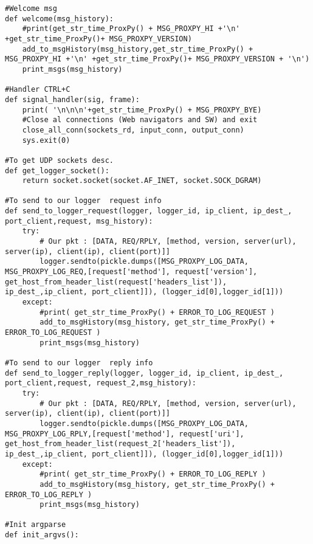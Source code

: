 \begin{verbatim}
#Welcome msg
def welcome(msg_history):
    #print(get_str_time_ProxPy() + MSG_PROXPY_HI +'\n' +get_str_time_ProxPy()+ MSG_PROXPY_VERSION)
    add_to_msgHistory(msg_history,get_str_time_ProxPy() + MSG_PROXPY_HI +'\n' +get_str_time_ProxPy()+ MSG_PROXPY_VERSION + '\n')
    print_msgs(msg_history)

#Handler CTRL+C
def signal_handler(sig, frame):
    print( '\n\n\n'+get_str_time_ProxPy() + MSG_PROXPY_BYE)
    #Close al connections (Web navigators and SW) and exit
    close_all_conn(sockets_rd, input_conn, output_conn)
    sys.exit(0)

#To get UDP sockets desc.
def get_logger_socket():
    return socket.socket(socket.AF_INET, socket.SOCK_DGRAM)

#To send to our logger  request info 
def send_to_logger_request(logger, logger_id, ip_client, ip_dest_, port_client,request, msg_history):
    try:
        # Our pkt : [DATA, REQ/RPLY, [method, version, server(url), server(ip), client(ip), client(port)]]
        logger.sendto(pickle.dumps([MSG_PROXPY_LOG_DATA, MSG_PROXPY_LOG_REQ,[request['method'], request['version'], get_host_from_header_list(request['headers_list']), ip_dest_,ip_client, port_client]]), (logger_id[0],logger_id[1]))
    except:
        #print( get_str_time_ProxPy() + ERROR_TO_LOG_REQUEST )
        add_to_msgHistory(msg_history, get_str_time_ProxPy() + ERROR_TO_LOG_REQUEST )
        print_msgs(msg_history)

#To send to our logger  reply info 
def send_to_logger_reply(logger, logger_id, ip_client, ip_dest_, port_client,request, request_2,msg_history):
    try:
        # Our pkt : [DATA, REQ/RPLY, [method, version, server(url), server(ip), client(ip), client(port)]]
        logger.sendto(pickle.dumps([MSG_PROXPY_LOG_DATA, MSG_PROXPY_LOG_RPLY,[request['method'], request['uri'], get_host_from_header_list(request_2['headers_list']), ip_dest_,ip_client, port_client]]), (logger_id[0],logger_id[1]))
    except:
        #print( get_str_time_ProxPy() + ERROR_TO_LOG_REPLY )
        add_to_msgHistory(msg_history, get_str_time_ProxPy() + ERROR_TO_LOG_REPLY )
        print_msgs(msg_history)

#Init argparse
def init_argvs():


\end{verbatim}
